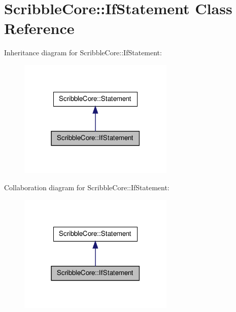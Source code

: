\hypertarget{class_scribble_core_1_1_if_statement}{\section{Scribble\-Core\-:\-:If\-Statement Class Reference}
\label{class_scribble_core_1_1_if_statement}
}


Inheritance diagram for Scribble\-Core\-:\-:If\-Statement\-:
\nopagebreak
\begin{figure}[H]
\begin{center}
\leavevmode
\includegraphics[width=210pt]{class_scribble_core_1_1_if_statement__inherit__graph}
\end{center}
\end{figure}


Collaboration diagram for Scribble\-Core\-:\-:If\-Statement\-:
\nopagebreak
\begin{figure}[H]
\begin{center}
\leavevmode
\includegraphics[width=210pt]{class_scribble_core_1_1_if_statement__coll__graph}
\end{center}
\end{figure}
